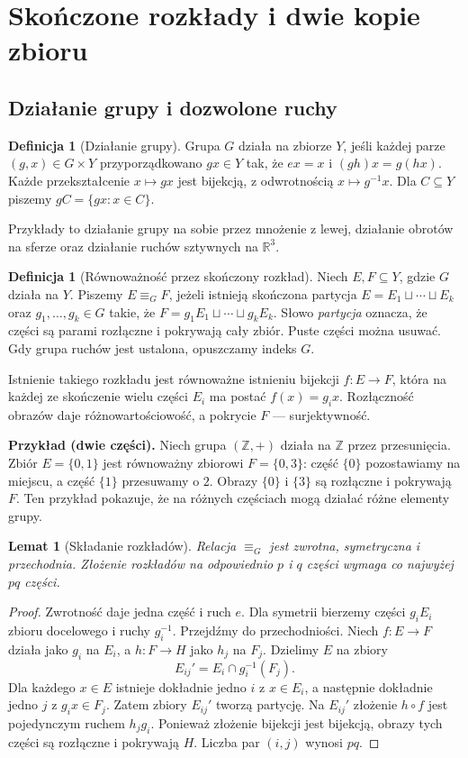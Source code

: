 \documentclass[11pt,a4paper]{article}
\numberwithin{equation}{section}
\theoremstyle{plain}
\newtheorem{lemat}[twierdzenie]{Lemat}
\theoremstyle{definition}
\newtheorem{definicja}[twierdzenie]{Definicja}
\theoremstyle{remark}
\newcommand{\R}{\mathbb R}
\newcommand{\Z}{\mathbb Z}
\newcommand{\equivG}{\mathrel{\equiv_G}}
\begin{document}
\section{Skończone rozkłady i dwie kopie zbioru}
\subsection{Działanie grupy i dozwolone ruchy}
\begin{definicja}[Działanie grupy]
Grupa $G$ działa na zbiorze $Y$, jeśli każdej parze $(g,x)\in G\times Y$ przyporządkowano $gx\in Y$ tak, że $ex=x$ i $(gh)x=g(hx)$. Każde przekształcenie $x\mapsto gx$ jest bijekcją, z odwrotnością $x\mapsto g^{-1}x$. Dla $C\subseteq Y$ piszemy $gC=\{gx:x\in C\}$.
\end{definicja}
Przykłady to działanie grupy na sobie przez mnożenie z lewej, działanie obrotów na sferze oraz działanie ruchów sztywnych na $\R^3$.
\begin{definicja}[Równoważność przez skończony rozkład]\label{def:rownorozklad}
Niech $E,F\subseteq Y$, gdzie $G$ działa na $Y$. Piszemy $E\equivG F$, jeżeli istnieją skończona partycja $E=E_1\sqcup\cdots\sqcup E_k$ oraz $g_1,\ldots,g_k\in G$ takie, że $F=g_1E_1\sqcup\cdots\sqcup g_kE_k$. Słowo \emph{partycja} oznacza, że części są parami rozłączne i pokrywają cały zbiór. Puste części można usuwać. Gdy grupa ruchów jest ustalona, opuszczamy indeks $G$.
\end{definicja}
Istnienie takiego rozkładu jest równoważne istnieniu bijekcji $f:E\to F$, która na każdej ze skończenie wielu części $E_i$ ma postać $f(x)=g_ix$. Rozłączność obrazów daje różnowartościowość, a pokrycie $F$ --- surjektywność.

\textbf{Przykład (dwie części).} Niech grupa $(\Z,+)$ działa na $\Z$ przez przesunięcia. Zbiór $E=\{0,1\}$ jest równoważny zbiorowi $F=\{0,3\}$: część $\{0\}$ pozostawiamy na miejscu, a część $\{1\}$ przesuwamy o $2$. Obrazy $\{0\}$ i $\{3\}$ są rozłączne i pokrywają $F$. Ten przykład pokazuje, że na różnych częściach mogą działać różne elementy grupy.

\begin{lemat}[Składanie rozkładów]\label{lem:skladanie}
Relacja $\equivG$ jest zwrotna, symetryczna i przechodnia. Złożenie rozkładów na odpowiednio $p$ i $q$ części wymaga co najwyżej $pq$ części.
\end{lemat}
\begin{proof}
Zwrotność daje jedna część i ruch $e$. Dla symetrii bierzemy części $g_iE_i$ zbioru docelowego i ruchy $g_i^{-1}$. Przejdźmy do przechodniości. Niech $f:E\to F$ działa jako $g_i$ na $E_i$, a $h:F\to H$ jako $h_j$ na $F_j$. Dzielimy $E$ na zbiory
\begin{equation}\label{eq:3-1}
 E_{ij}'=E_i\cap g_i^{-1}(F_j).
\end{equation}
Dla każdego $x\in E$ istnieje dokładnie jedno $i$ z $x\in E_i$, a następnie dokładnie jedno $j$ z $g_ix\in F_j$. Zatem zbiory $E_{ij}'$ tworzą partycję. Na $E_{ij}'$ złożenie $h\circ f$ jest pojedynczym ruchem $h_jg_i$. Ponieważ złożenie bijekcji jest bijekcją, obrazy tych części są rozłączne i pokrywają $H$. Liczba par $(i,j)$ wynosi $pq$.
\end{proof}
\end{document}
